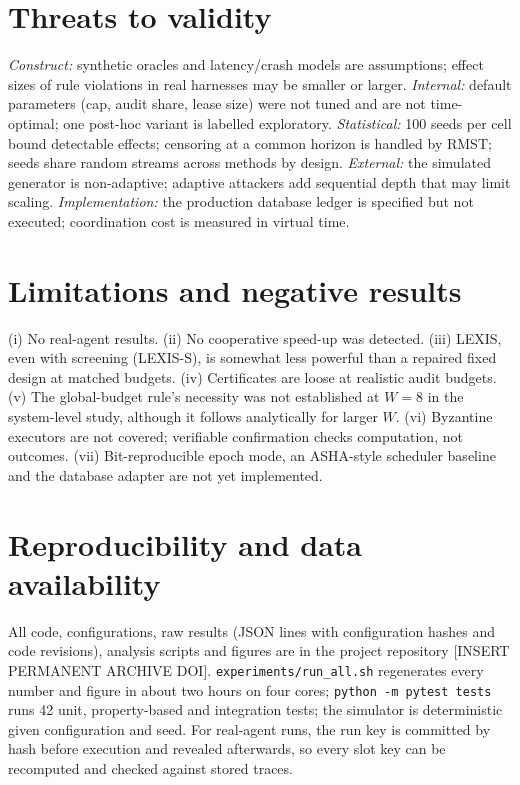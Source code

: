 \documentclass[11pt]{article}
\theoremstyle{definition}
\theoremstyle{remark}
\newcommand{\todo}[1]{\textcolor{red!70!black}{[#1]}}
\begin{document}
\section{Threats to validity}\label{sec:threats}
\textit{Construct:} synthetic oracles and latency/crash models are assumptions; effect sizes of rule violations in real harnesses may be smaller or larger. \textit{Internal:} default parameters (cap, audit share, lease size) were not tuned and are not time-optimal; one post-hoc variant is labelled exploratory. \textit{Statistical:} 100 seeds per cell bound detectable effects; censoring at a common horizon is handled by RMST; seeds share random streams across methods by design. \textit{External:} the simulated generator is non-adaptive; adaptive attackers add sequential depth that may limit scaling. \textit{Implementation:} the production database ledger is specified but not executed; coordination cost is measured in virtual time.

\section{Limitations and negative results}\label{sec:limits}
(i) No real-agent results. (ii) No cooperative speed-up was detected. (iii) LEXIS, even with screening (LEXIS-S), is somewhat less powerful than a repaired fixed design at matched budgets. (iv) Certificates are loose at realistic audit budgets. (v) The global-budget rule's necessity was not established at $W=8$ in the system-level study, although it follows analytically for larger $W$. (vi) Byzantine executors are not covered; verifiable confirmation checks computation, not outcomes. (vii) Bit-reproducible epoch mode, an ASHA-style scheduler baseline and the database adapter are not yet implemented.

\section{Reproducibility and data availability}\label{sec:repro}
All code, configurations, raw results (JSON lines with configuration hashes and code revisions), analysis scripts and figures are in the project repository \todo{INSERT PERMANENT ARCHIVE DOI}. \texttt{experiments/run\_all.sh} regenerates every number and figure in about two hours on four cores; \texttt{python -m pytest tests} runs 42 unit, property-based and integration tests; the simulator is deterministic given configuration and seed. For real-agent runs, the run key is committed by hash before execution and revealed afterwards, so every slot key can be recomputed and checked against stored traces.
\end{document}
